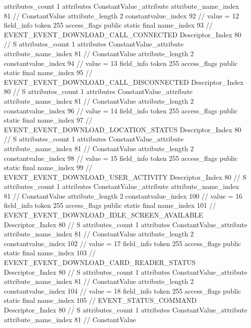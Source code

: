 {{{{{				attributes_count	1
				attributes {
				ConstantValue_attribute {
					attribute_name_index	81		// ConstantValue
					attribute_length	2
					constantvalue_index	92		// value = 12
				}
				}
			}
			field_info {
				token	255
				access_flags	public static final
				name_index	93		// EVENT_EVENT_DOWNLOAD_CALL_CONNECTED
				Descriptor_Index	80		// S
				attributes_count	1
				attributes {
				ConstantValue_attribute {
					attribute_name_index	81		// ConstantValue
					attribute_length	2
					constantvalue_index	94		// value = 13
				}
				}
			}
			field_info {
				token	255
				access_flags	public static final
				name_index	95		// EVENT_EVENT_DOWNLOAD_CALL_DISCONNECTED
				Descriptor_Index	80		// S
				attributes_count	1
				attributes {
				ConstantValue_attribute {
					attribute_name_index	81		// ConstantValue
					attribute_length	2
					constantvalue_index	96		// value = 14
				}
				}
			}
			field_info {
				token	255
				access_flags	public static final
				name_index	97		// EVENT_EVENT_DOWNLOAD_LOCATION_STATUS
				Descriptor_Index	80		// S
				attributes_count	1
				attributes {
				ConstantValue_attribute {
					attribute_name_index	81		// ConstantValue
					attribute_length	2
					constantvalue_index	98		// value = 15
				}
				}
			}
			field_info {
				token	255
				access_flags	public static final
				name_index	99		// EVENT_EVENT_DOWNLOAD_USER_ACTIVITY
				Descriptor_Index	80		// S
				attributes_count	1
				attributes {
				ConstantValue_attribute {
					attribute_name_index	81		// ConstantValue
					attribute_length	2
					constantvalue_index	100		// value = 16
				}
				}
			}
			field_info {
				token	255
				access_flags	public static final
				name_index	101		// EVENT_EVENT_DOWNLOAD_IDLE_SCREEN_AVAILABLE
				Descriptor_Index	80		// S
				attributes_count	1
				attributes {
				ConstantValue_attribute {
					attribute_name_index	81		// ConstantValue
					attribute_length	2
					constantvalue_index	102		// value = 17
				}
				}
			}
			field_info {
				token	255
				access_flags	public static final
				name_index	103		// EVENT_EVENT_DOWNLOAD_CARD_READER_STATUS
				Descriptor_Index	80		// S
				attributes_count	1
				attributes {
				ConstantValue_attribute {
					attribute_name_index	81		// ConstantValue
					attribute_length	2
					constantvalue_index	104		// value = 18
				}
				}
			}
			field_info {
				token	255
				access_flags	public static final
				name_index	105		// EVENT_STATUS_COMMAND
				Descriptor_Index	80		// S
				attributes_count	1
				attributes {
				ConstantValue_attribute {
					attribute_name_index	81		// ConstantValue
}}}}}}}
